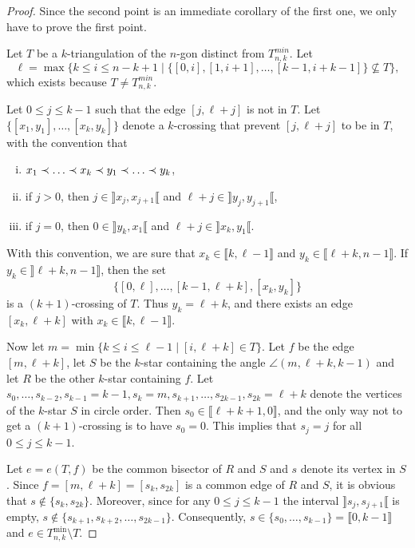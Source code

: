 \documentclass[12pt]{amsart}
\begin{document}
\begin{proof}
Since the second point is an immediate corollary of the first one, we only have to prove the first point.

Let $T$ be a $k$-triangulation of the $n$-gon distinct from $T_{n,k}^{min}$. Let
$$\ell=\max\{k\le i\le n-k+1\;|\;\{[0,i],[1,i+1],\ldots,[k-1,i+k-1]\}\nsubseteq T\},$$
which exists because $T\ne T_{n,k}^{min}$.

Let $0\le j\le k-1$ such that the edge $[j,\ell+j]$ is not in $T$. Let $\{[x_1,y_1],\ldots,[x_k,y_k]\}$ denote a $k$-crossing that prevent $[j,\ell+j]$ to be in $T$, with the convention that
\begin{enumerate}[(i)]
\item $x_1\prec \ldots\prec x_k\prec y_1\prec \ldots\prec y_k$,
\item if $j>0$, then $j\in\rrbracket x_j,x_{j+1}\llbracket$ and $\ell+j\in\rrbracket y_j,y_{j+1}\llbracket$,
\item if $j=0$, then $0\in\rrbracket y_k,x_1\llbracket$ and $\ell+j\in\rrbracket x_k,y_1\llbracket$.
\end{enumerate}
With this convention, we are sure that $x_k\in\llbracket k,\ell-1\rrbracket$ and $y_k\in\llbracket \ell+k,n-1\rrbracket$. If $y_k\in \rrbracket \ell+k,n-1\rrbracket$, then the set
$$\{[0,\ell],\ldots,[k-1,\ell+k],[x_k,y_k]\}$$
is a $(k+1)$-crossing of $T$. Thus $y_k=\ell+k$, and there exists an edge $[x_k,\ell+k]$ with $x_k\in\llbracket k,\ell-1\rrbracket$.

Now let $m=\min\{k\le i\le \ell-1\;|\; [i,\ell+k]\in T\}$. Let $f$ be the edge $[m,\ell+k]$, let $S$ be the $k$-star containing the angle $\angle(m,\ell+k,k-1)$ and let $R$ be the other $k$-star containing $f$. Let $s_0, \ldots,s_{k-2},s_{k-1}=k-1,s_k=m,s_{k+1},\ldots,s_{2k-1},s_{2k}=\ell+k$ denote the vertices of the $k$-star $S$ in circle order. Then $s_0\in\llbracket \ell+k+1, 0\rrbracket$, and the only way not to get a $(k+1)$-crossing is to have $s_0=0$. This implies that $s_j=j$ for all $0\le j\le k-1$. 

Let $e=e(T,f)$ be the common bisector of $R$ and $S$ and $s$ denote its vertex in $S$. Since $f=[m,\ell+k]=[s_k,s_{2k}]$ is a common edge of $R$ and $S$, it is obvious that $s\notin\{s_k,s_{2k}\}$. Moreover, since for any $0\le j\le k-1$ the interval $\rrbracket s_j,s_{j+1}\llbracket$ is empty, $s\notin\{s_{k+1},s_{k+2},\ldots,s_{2k-1}\}$. Consequently, $s\in\{s_0,\ldots,s_{k-1}\}=\llbracket 0,k-1\rrbracket$ and $e\in T_{n,k}^{\min}\setminus T$.
\end{proof}
\end{document}
